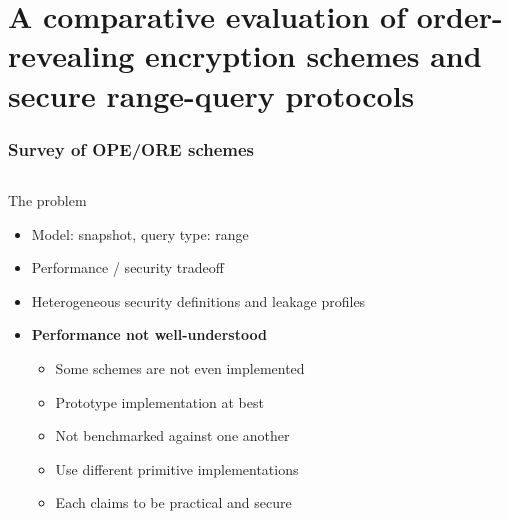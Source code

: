 \section{A comparative evaluation of order-revealing encryption schemes and secure range-query protocols~\cite{ore-benchmark-17}}

	\begin{frame}[label={frame:ore}]

		\frametitle{Survey of OPE/ORE schemes~\cite{ore-benchmark-17}}

		\begin{columns}[T,onlytextwidth]

				\begin{block}{The problem}

					\begin{itemize}[leftmargin=*]
						\item Model: \alert{snapshot}, query type: \alert{range}
						\item Performance / security tradeoff
						\item Heterogeneous security definitions and leakage profiles
						\item \textbf{Performance not well-understood}
						\begin{itemize}[leftmargin=*]
							\item Some schemes are not even implemented
							\item Prototype implementation at best
							\item Not benchmarked against one another
							\item Use different primitive implementations
							\item Each claims to be practical and secure
						\end{itemize}
					\end{itemize}

				\end{block}


\end{columns}
\end{frame}
